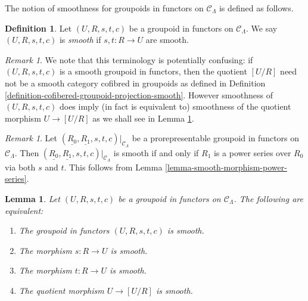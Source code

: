 \documentclass{stacks-project}
\theoremstyle{plain}
\newtheorem{lemma}[subsection]{Lemma}
\theoremstyle{definition}
\newtheorem{definition}[subsection]{Definition}
\theoremstyle{remark}
\newtheorem{remark}[subsection]{Remark}
\numberwithin{equation}{subsection}
\begin{document}
\noindent
The notion of smoothness for groupoids in functors on $\mathcal{C}_\Lambda$ is
defined as follows.

\begin{definition}
\label{definition-smooth-groupoid-in-functors}
Let $(U, R, s, t, c)$ be a groupoid in functors on $\mathcal{C}_\Lambda$. We
say $(U, R, s, t, c)$ is {\it smooth} if $s, t: R \to U$ are smooth.
\end{definition}

\begin{remark}
\label{remark-smooth-groupoid-in-functors-warning}
We note that this terminology is potentially confusing:
if $(U, R, s, t, c)$ is a smooth groupoid in functors, then the quotient
$[U/R]$ need not be a smooth category cofibred in groupoids as defined in
Definition \ref{definition-cofibered-groupoid-projection-smooth}.
However smoothness of $(U, R, s, t, c)$ does imply (in fact is equivalent to)
smoothness of the quotient morphism $U \to [U/R]$ as we shall
see in
Lemma \ref{lemma-smooth-quotient-morphism}.
\end{remark}

\begin{remark}
\label{remark-smooth-power-series-prorepresentable-smooth-groupoid-in-functors}
Let $(\underline{R_0}, \underline{R_1}, s, t, c)|_{\mathcal{C}_\Lambda}$
be a prorepresentable groupoid in functors on $\mathcal{C}_\Lambda$.
Then $(\underline{R_0}, \underline{R_1}, s, t, c)|_{\mathcal{C}_\Lambda}$
is smooth if and only if $R_1$ is a power series over $R_0$ via both $s$
and $t$. This follows from
Lemma \ref{lemma-smooth-morphism-power-series}.
\end{remark}

\begin{lemma}
\label{lemma-smooth-quotient-morphism}
Let $(U, R, s, t, c)$ be a groupoid in functors on $\mathcal{C}_\Lambda$.
The following are equivalent:
\begin{enumerate}
\item The groupoid in functors $(U, R, s, t, c)$ is smooth.
\item The morphism $s : R \to U$ is smooth.
\item The morphism $t : R \to U$ is smooth.
\item The quotient morphism $U \to [U/R]$ is smooth.
\end{enumerate}
\end{lemma}
\end{document}
